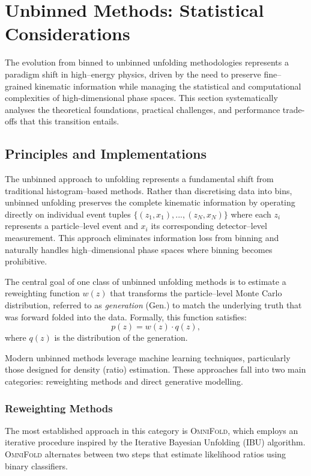 \section{Unbinned Methods: Statistical Considerations}  
    The evolution from binned to unbinned unfolding methodologies represents a paradigm shift in high--energy physics, driven by the need to preserve fine--grained kinematic information while managing the statistical and computational complexities of high-dimensional phase spaces.
    This section systematically analyses the theoretical foundations, practical challenges, and performance trade-offs that this transition entails.
    \subsection{Principles and Implementations}
        The unbinned approach to unfolding represents a fundamental shift from traditional histogram--based methods.
        Rather than discretising data into bins, unbinned unfolding preserves the complete kinematic information by operating directly on individual event tuples \(\{(z_1, x_1), ..., (z_N, x_N)\}\) where each \(z_i\) represents a particle--level event and \(x_i\) its corresponding detector--level measurement.
        This approach eliminates information loss from binning and naturally handles high--dimensional phase spaces where binning becomes prohibitive.

        The central goal of one class of unbinned unfolding methods is to estimate a reweighting function \(w(z)\) that transforms the particle--level Monte Carlo distribution, referred to as \emph{generation} (Gen.) to match the underlying truth that was forward folded into the data.
        Formally, this function satisfies:
        \begin{equation}
            p(z) = w(z) \cdot q(z),
        \end{equation}
        where \(q(z)\) is the distribution of the generation.

        Modern unbinned methods leverage machine learning techniques, particularly those designed for density (ratio) estimation.
        These approaches fall into two main categories: reweighting methods and direct generative modelling.
        \subsubsection{Reweighting Methods}
            The most established approach in this category is \textsc{OmniFold}, which employs an iterative procedure inspired by the Iterative Bayesian Unfolding (IBU) algorithm.
            \textsc{OmniFold} alternates between two steps that estimate likelihood ratios using binary classifiers.
            
